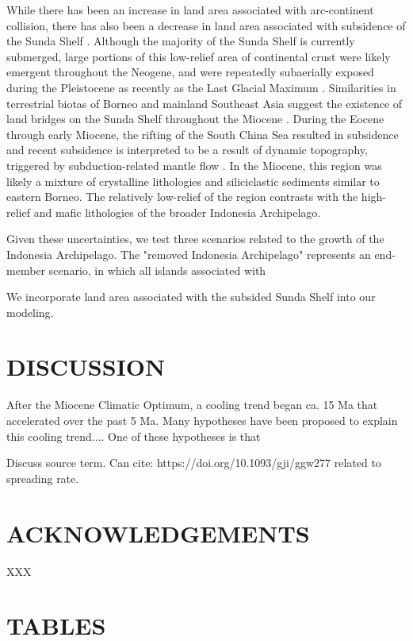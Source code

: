\documentclass[11pt,letterpaper]{article}
\begin{document}
While there has been an increase in land area associated with arc-continent collision, there has also been a decrease in land area associated with subsidence of the Sunda Shelf \citep{Sarr2019a}. Although the majority of the Sunda Shelf is currently submerged, large portions of this low-relief area of continental crust were likely emergent throughout the Neogene, and were repeatedly subaerially exposed during the Pleistocene as recently as the Last Glacial Maximum \citep{Halls2002a}. Similarities in terrestrial biotas of Borneo and mainland Southeast Asia suggest the existence of land bridges on the Sunda Shelf throughout the Miocene \citep{Moss1998a}. During the Eocene through early Miocene, the rifting of the South China Sea resulted in subsidence \citep{Morley2013a} and recent subsidence is interpreted to be a result of dynamic topography, triggered by subduction-related mantle flow \citep{Sarr2019a}. In the Miocene, this region was likely a mixture of crystalline lithologies and siliciclastic sediments similar to eastern Borneo. The relatively low-relief of the region contrasts with the high-relief and mafic lithologies of the broader Indonesia Archipelago.

Given these uncertainties, we test three scenarios related to the growth of the Indonesia Archipelago. The "removed Indonesia Archipelago" represents an end-member scenario, in which all islands associated with 


We incorporate land area associated with the subsided Sunda Shelf into our modeling.

\section*{DISCUSSION}

After the Miocene Climatic Optimum, a cooling trend began ca. 15 Ma that accelerated over the past 5 Ma. Many hypotheses have been proposed to explain this cooling trend.... One of these hypotheses is that

Discuss source term. Can cite: https://doi.org/10.1093/gji/ggw277 related to spreading rate.

\section*{ACKNOWLEDGEMENTS \label{sec:ACKNOWLEDGEMENTS}}

XXX

\clearpage
\newpage

\section*{TABLES}
\end{document}
